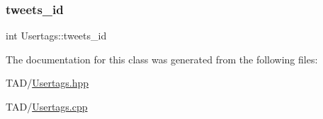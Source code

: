 \mbox{\label{class_usertags_a1f3caf61ffeebbd39c59b0a8bf0a378b}} 
\subsubsection{\texorpdfstring{tweets\+\_\+id}{tweets\_id}}
{\footnotesize\ttfamily int Usertags\+::tweets\+\_\+id\hspace{0.3cm}{\ttfamily [private]}}



The documentation for this class was generated from the following files\+:\begin{DoxyCompactItemize}
\item 
T\+A\+D/\hyperlink{_usertags_8hpp}{Usertags.\+hpp}\item 
T\+A\+D/\hyperlink{_usertags_8cpp}{Usertags.\+cpp}\end{DoxyCompactItemize}
